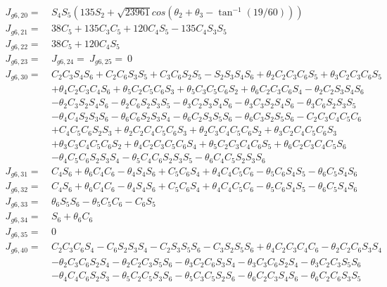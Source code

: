 \documentclass[12pt]{article}
\begin{document}
\begin{CJK}{UTF8}{bsmi}
\begin{equation*}
\begin{split}
J_{g6,20} =\  &S_4S_5(135S_2 + \sqrt{23961}cos(\theta _2 + \theta _3 - \tan ^{-1}(19/60)))\\
J_{g6,21} =\  &38C_5 + 135C_3C_5 + 120C_4S_5 - 135C_4S_3S_5\\
J_{g6,22} =\  &38C_5 + 120C_4S_5\\
J_{g6,23} =\  &
J_{g6,24} =\  
J_{g6,25} =\  0\\
J_{g6,30} =\  &C_2C_3S_4S_6 + C_2C_6S_3S_5 + C_3C_6S_2S_5 - S_2S_3S_4S_6 + \theta _2C_2C_3C_6S_5 + \theta _3C_2C_3C_6S_5 \\
			  &+ \theta _4C_2C_3C_4S_6 + \theta _5C_2C_5C_6S_3 + \theta _5C_3C_5C_6S_2 + \theta _6C_2C_3C_6S_4 - \theta _2C_2S_3S_4S_6\\
			  & - \theta _2C_3S_2S_4S_6 - \theta _2C_6S_2S_3S_5 - \theta _3C_2S_3S_4S_6 - \theta _3C_3S_2S_4S_6 - \theta _3C_6S_2S_3S_5\\
			  & - \theta _4C_4S_2S_3S_6 - \theta _6C_6S_2S_3S_4 - \theta _6C_2S_3S_5S_6 - \theta _6C_3S_2S_5S_6 - C_2C_3C_4C_5C_6\\
			  & + C_4C_5C_6S_2S_3 + \theta _2C_2C_4C_5C_6S_3 + \theta _2C_3C_4C_5C_6S_2 + \theta _3C_2C_4C_5C_6S_3\\
			  & + \theta _3C_3C_4C_5C_6S_2 + \theta _4C_2C_3C_5C_6S_4 + \theta _5C_2C_3C_4C_6S_5 + \theta _6C_2C_3C_4C_5S_6\\
			  & - \theta _4C_5C_6S_2S_3S_4 - \theta _5C_4C_6S_2S_3S_5 - \theta _6C_4C_5S_2S_3S_6\\
J_{g6,31} =\  &C_4S_6 + \theta _6C_4C_6 - \theta _4S_4S_6 + C_5C_6S_4 + \theta _4C_4C_5C_6 - \theta _5C_6S_4S_5 - \theta _6C_5S_4S_6\\
J_{g6,32} =\  &C_4S_6 + \theta _6C_4C_6 - \theta _4S_4S_6 + C_5C_6S_4 + \theta _4C_4C_5C_6 - \theta _5C_6S_4S_5 - \theta _6C_5S_4S_6\\
J_{g6,33} =\  &\theta _6S_5S_6 - \theta _5C_5C_6 - C_6S_5\\
J_{g6,34} =\  &S_6 + \theta _6C_6\\
J_{g6,35} =\  &0\\
J_{g6,40} =\  &C_2C_3C_6S_4 - C_6S_2S_3S_4 - C_2S_3S_5S_6 - C_3S_2S_5S_6 + \theta _4C_2C_3C_4C_6 - \theta _2C_2C_6S_3S_4\\
			  & - \theta _2C_3C_6S_2S_4 - \theta _2C_2C_3S_5S_6 - \theta _3C_2C_6S_3S_4 - \theta _3C_3C_6S_2S_4 - \theta _3C_2C_3S_5S_6\\
			  & - \theta _4C_4C_6S_2S_3 - \theta _5C_2C_5S_3S_6 - \theta _5C_3C_5S_2S_6 - \theta _6C_2C_3S_4S_6 - \theta _6C_2C_6S_3S_5\\

\end{split}
\end{equation*}
\end{CJK}
\end{document}
